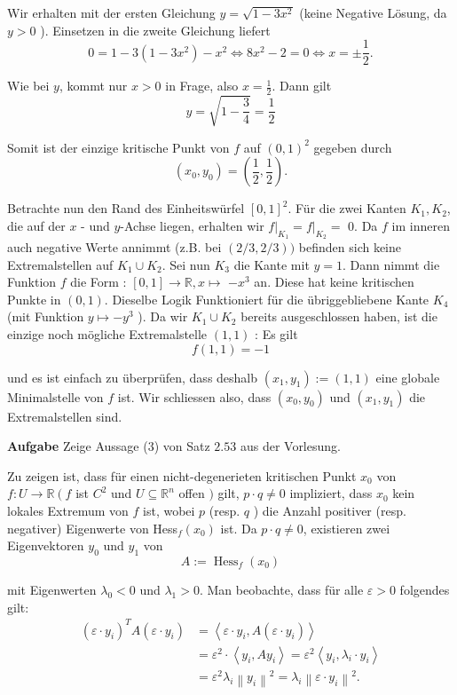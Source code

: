 Wir erhalten mit der ersten Gleichung $y=\sqrt{1-3 x^{2}}$ (keine Negative Lösung, da $y>0$ ).
Einsetzen in die zweite Gleichung liefert
$$0=1-3\left(1-3 x^{2}\right)-x^{2} \Longleftrightarrow 8 x^{2}-2=0 \Longleftrightarrow x=\pm \frac{1}{2} .$$

Wie bei $y$, kommt nur $x>0$ in Frage, also $x=\frac{1}{2}$. Dann gilt
$$y=\sqrt{1-\frac{3}{4}}=\frac{1}{2}$$

Somit ist der einzige kritische Punkt von $f$ auf $(0,1)^{2}$ gegeben durch
$$\left(x_{0}, y_{0}\right)=\left(\frac{1}{2}, \frac{1}{2}\right) .$$


Betrachte nun den Rand des Einheitswürfel $[0,1]^{2}$. Für die zwei Kanten $K_{1}, K_{2}$, die auf
der $x$ - und $y$-Achse liegen, erhalten wir $\left.f\right|_{K_{1}}=\left.f\right|_{K_{2}}=$ 0. Da
$f$ im inneren auch negative Werte annimmt (z.B. bei $(2 / 3,2 / 3))$ befinden sich keine
Extremalstellen auf $K_{1} \cup K_{2}$. Sei nun $K_{3}$ die Kante mit $y=1$. Dann nimmt die Funktion
$f$ die Form : $[0,1] \rightarrow \mathbb{R}, x \mapsto$ $-x^{3}$ an. Diese hat keine kritischen
Punkte in $(0,1)$. Dieselbe Logik Funktioniert für die übriggebliebene Kante $K_{4}$ (mit Funktion 
$y \mapsto-y^{3}$ ). Da wir $K_{1} \cup K_{2}$ bereits ausgeschlossen haben, ist die einzige noch
mögliche Extremalstelle $(1,1)$ : Es gilt
$$f(1,1)=-1$$

und es ist einfach zu überprüfen, dass deshalb $\left(x_{1}, y_{1}\right):=(1,1)$ eine globale Minimalstelle von $f$ ist. Wir schliessen also, dass $\left(x_{0}, y_{0}\right) \text { und }\left(x_{1}, y_{1}\right)$ die Extremalstellen sind.

\hrulefill

\textbf{Aufgabe} Zeige Aussage (3) von Satz $2.53$ aus der Vorlesung.

Zu zeigen ist, dass für einen nicht-degenerieten kritischen Punkt $x_{0}$ von $f: U \rightarrow
\mathbb{R}\left(f\right.$ ist $C^{2}$ und $U \subseteq \mathbb{R}^{n}$ offen $)$ gilt, 
$p \cdot q \neq 0$ impliziert, dass $x_{0}$ kein lokales Extremum von $f$ ist, wobei $p$ (resp. $q$ )
die Anzahl positiver (resp. negativer) Eigenwerte von Hess$_{f}\left(x_{0}\right)$ ist. Da 
$p \cdot q \neq 0$, existieren zwei Eigenvektoren $y_{0}$ und $y_{1}$ von
$$
A:=\operatorname{Hess}_{f}\left(x_{0}\right)
$$

mit Eigenwerten $\lambda_{0}<0$ und $\lambda_{1}>0$. Man beobachte, dass für alle $\varepsilon>0$ folgendes gilt:
$$
\begin{aligned}
\left(\varepsilon \cdot y_{i}\right)^{T} A\left(\varepsilon \cdot y_{i}\right) &=\left\langle\varepsilon \cdot y_{i}, A\left(\varepsilon \cdot y_{i}\right)\right\rangle \\
&=\varepsilon^{2} \cdot\left\langle y_{i}, A y_{i}\right\rangle =\varepsilon^{2}\left\langle y_{i}, \lambda_{i} \cdot y_{i}\right\rangle \\
&=\varepsilon^{2} \lambda_{i}\left\|y_{i}\right\|^{2} =\lambda_{i}\left\|\varepsilon \cdot y_{i}\right\|^{2} .
\end{aligned}
$$

